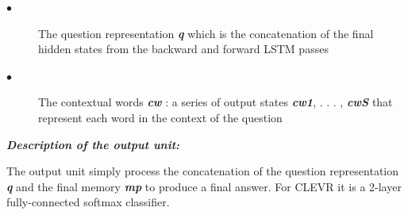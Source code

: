 \begin{description}
	\item[$\bullet$] The question representation \textbf{\textit{q}} which is the concatenation of the final hidden states from the backward and forward LSTM passes
	\item[$\bullet$] The contextual words \textbf{\textit{cw}} : a series of output states \textbf{\textit{cw1}}, . . . , \textbf{\textit{cwS}} that represent each word in the context of the question
\end{description}



\textbf{\textit{Description of the output unit:}}

The output unit simply process the concatenation of the question representation  \textbf{\textit{q}} and the final memory  \textbf{\textit{mp}} to produce a final answer. For CLEVR it is a 2-layer fully-connected softmax classifier.




